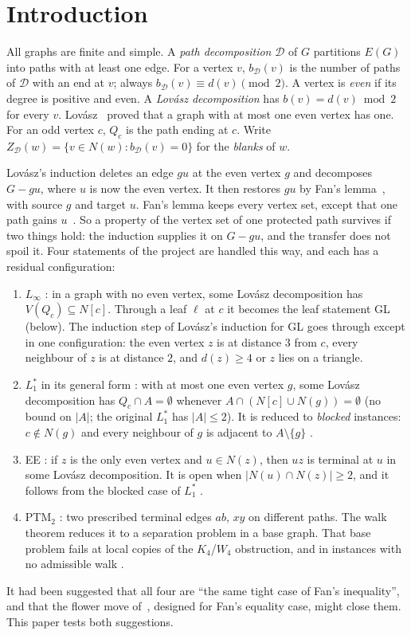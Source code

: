 \documentclass[11pt]{amsart}
\theoremstyle{definition}
\newcommand{\cD}{\mathcal D}
\begin{document}
\section{Introduction}\label{sec:intro}

All graphs are finite and simple. A \emph{path decomposition} $\cD$ of $G$ partitions $E(G)$ into
paths with at least one edge. For a vertex $v$, $b_\cD(v)$ is the number of paths of $\cD$ with an
end at $v$; always $b_\cD(v)\equiv d(v)\pmod2$. A vertex is \emph{even} if its degree is positive and
even. A \emph{Lov\'asz decomposition} has $b(v)=d(v)\bmod2$ for every $v$. Lov\'asz~\cite{L68} proved
that a graph with at most one even vertex has one. For an odd vertex $c$, $Q_c$ is the path ending at
$c$. Write $Z_\cD(w)=\{v\in N(w):b_\cD(v)=0\}$ for the \emph{blanks} of $w$.

Lov\'asz's induction deletes an edge $gu$ at the even vertex $g$ and decomposes $G-gu$, where $u$ is
now the even vertex. It then restores $gu$ by Fan's lemma~\cite{Fan05}, with source $g$ and target
$u$. Fan's lemma keeps every vertex set, except that one path gains $u$~\cite[Lemma~2.2]{RD}. So a
property of the vertex set of one protected path survives if two things hold: the induction supplies
it on $G-gu$, and the transfer does not spoil it. Four statements of the project are handled this
way, and each has a residual configuration:
\begin{enumerate}
\item[(R1)] $L_\infty$ \cite[\S8]{RD}: in a graph with no even vertex, some Lov\'asz decomposition
has $V(Q_c)\subseteq N[c]$. Through a leaf $\ell$ at $c$ it becomes the leaf statement GL (below).
The induction step of Lov\'asz's induction for GL goes through except in one configuration: the even
vertex $z$ is at distance $3$ from $c$, every neighbour of $z$ is at distance $2$, and $d(z)\ge4$ or
$z$ lies on a triangle.
\item[(R2)] $L_1^*$ in its general form \cite[Conjecture~1.3]{L1S}: with at most one even vertex
$g$, some Lov\'asz decomposition has $Q_c\cap A=\emptyset$ whenever $A\cap(N[c]\cup N(g))=\emptyset$
(no bound on $|A|$; the original $L_1^*$ has $|A|\le2$). It is reduced to \emph{blocked} instances:
$c\notin N(g)$ and every neighbour of $g$ is adjacent to $A\setminus\{g\}$ \cite[Theorem~4.3]{L1S}.
\item[(R3)] EE \cite{PE}: if $z$ is the only even vertex and $u\in N(z)$, then $uz$ is terminal
at $u$ in some Lov\'asz decomposition. It is open when $|N(u)\cap N(z)|\ge2$, and it follows from
the blocked case of $L_1^*$ \cite[Corollary~4.4]{L1S}.
\item[(R4)] PTM$_2$ \cite{TM}: two prescribed terminal edges $ab$, $xy$ on different paths. The
walk theorem \cite[Theorem~4.2]{TM} reduces it to a separation problem in a base graph. That base
problem fails at local copies of the $K_4$/$W_4$ obstruction, and in instances with no admissible
walk \cite[\S8]{TM}.
\end{enumerate}
It had been suggested that all four are ``the same tight case of Fan's inequality'', and that the
flower move of~\cite[\S7]{ES}, designed for Fan's equality case, might close them. This paper tests
both suggestions.
\end{document}
